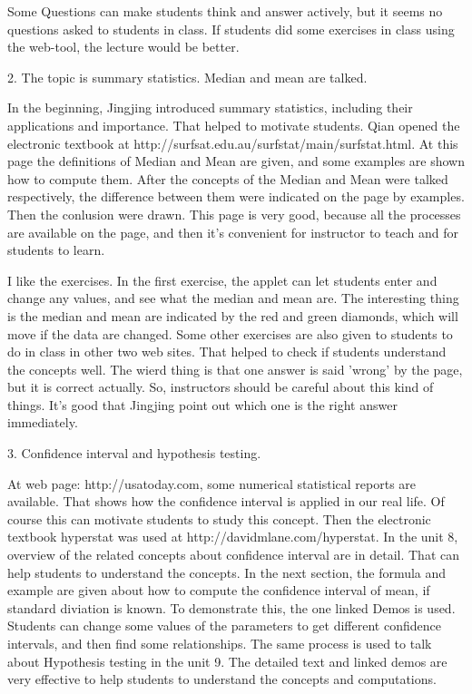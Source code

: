 Some Questions can make students think and answer actively, but it seems no 
questions asked to students in class. If students did some exercises in class 
using the web-tool, the lecture would be better.


2. The topic is summary statistics. Median and mean are talked.

In the beginning, Jingjing introduced summary statistics, including their 
applications and importance. That helped to motivate students. Qian opened the 
electronic textbook at http://surfsat.edu.au/surfstat/main/surfstat.html. At 
this page the definitions of Median and Mean are given, and some examples are 
shown how to compute them. After the concepts of the Median and Mean were 
talked respectively, the difference between them were indicated on the page by 
examples. Then the conlusion were drawn. This page is very good, because all 
the processes are available on the page, and then it's convenient for 
instructor to teach and for students to learn.

I like the exercises. In the first exercise, the applet can let students enter 
and change any values, and see what the median and mean are. The interesting 
thing is the median and mean are indicated by the red and green diamonds, 
which will move if the data are changed. Some other exercises are also given 
to students to do in class in other two web sites. That helped to check if 
students understand the concepts well. The wierd thing is that one answer is 
said  'wrong' by the page, but it is correct actually. So, instructors should 
be careful about this kind of things. It's good that Jingjing point out which 
one is the right answer immediately.


3. Confidence interval and hypothesis testing.

At web page: http://usatoday.com, some numerical statistical reports are 
available. That shows how the confidence interval is applied in our real life. 
Of course this can motivate students to study this concept. Then the 
electronic textbook hyperstat was used at http://davidmlane.com/hyperstat. In 
the unit 8, overview of the related concepts about confidence interval are in 
detail. That can help students to understand the concepts. In the next 
section, the formula and example are given about how to compute the confidence 
interval of mean, if standard diviation is known. To demonstrate this, the one 
linked Demos is used. Students can change some values of the parameters to get 
different confidence intervals, and then find some relationships. The same 
process is used to talk about Hypothesis testing in the unit 9. The detailed 
text and linked demos are very effective to help students to understand the 
concepts and computations.

